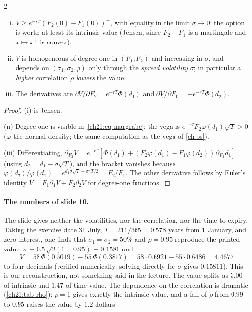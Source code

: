 \begin{paracol}{2}
\begin{proposition}[Properties]\label{ch21:prop-props}
\leavevmode
\begin{enumerate}[(i)]
  \item $V\ge e^{-rT}(F_2(0)-F_1(0))^+$, with equality in the limit $\sigma\to0$: the option is worth at least its intrinsic value (Jensen, since $F_2-F_1$ is a martingale and $x\mapsto x^+$ is convex).
  \item $V$ is homogeneous of degree one in $(F_1,F_2)$ and increasing in $\sigma$, and depends on $(\sigma_1,\sigma_2,\rho)$ only through the \emph{spread volatility} $\sigma$; in particular a \emph{higher} correlation $\rho$ \emph{lowers} the value.
  \item The derivatives are $\partial V/\partial F_2=e^{-rT}\Phi(d_1)$ and $\partial V/\partial F_1=-e^{-rT}\Phi(d_2)$.
\end{enumerate}
\end{proposition}
\begin{proof}
(i) is Jensen.

(ii) Degree one is visible in~\eqref{ch21:eq-margrabe}; the vega is $e^{-rT}F_2\varphi(d_1)\sqrt T>0$ ($\varphi$ the normal density; the same computation as the vega of \cref{ch:bs}).

(iii) Differentiating,
$\partial_{F_2}V=e^{-rT}[\Phi(d_1)+(F_2\varphi(d_1)-F_1\varphi(d_2))\,\partial_{F_2}d_1]$ (using $d_2=d_1-\sigma\sqrt T$), and the bracket vanishes because
$\varphi(d_2)/\varphi(d_1)=e^{d_1\sigma\sqrt T-\sigma^2T/2}=F_2/F_1$. The other derivative follows by Euler's identity $V=F_1\partial_1V+F_2\partial_2V$ for degree-one functions.
\end{proof}

\paragraph{The numbers of slide 10.} The slide gives neither the volatilities, nor the correlation, nor the time to expiry. Taking the exercise date 31 July, $T=211/365=0.578$ years from 1 January, and
zero interest, one finds that $\sigma_1=\sigma_2=50\%$ and $\rho=0.95$ reproduce the printed value: $\sigma=0.5\sqrt{2(1-0.95)}=0.1581$ and
\[
  V=58\,\Phi(0.5019)-55\,\Phi(0.3817)=58\cdot0.6921-55\cdot0.6486=4.4677
\]
to four decimals (verified numerically; solving directly for $\sigma$ gives $0.15811$). This is our reconstruction, not something said in the lecture. The value splits as $3.00$ of intrinsic and $1.47$ of time value. The dependence on the correlation
is dramatic (\cref{ch21:tab-rho}): $\rho=1$ gives exactly the intrinsic value, and a fall of $\rho$ from $0.99$ to $0.95$ raises the value by $1.2$ dollars.


\end{paracol}
